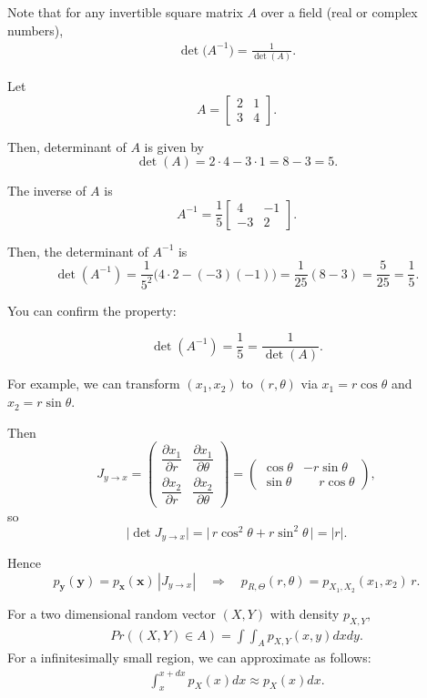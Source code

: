 Note that for any invertible square matrix $A$ over a field (\eg real or complex numbers),
\begin{align*}
	\det\bigl(A^{-1}\bigr)=\frac{1}{\det(A)}.
\end{align*}

Let
$$
A=\begin{bmatrix}
2 & 1\\[2pt]
3 & 4
\end{bmatrix}.
$$

Then, determinant of $A$ is given by
$$
\det(A)=2\cdot4-3\cdot1 = 8-3 = 5.
$$

The inverse of $A$ is 
$$
A^{-1}= \frac{1}{5}\begin{bmatrix}
4 & -1\\[2pt] -3 & 2
\end{bmatrix}.
$$

Then, the determinant of $A^{-1}$ is
$$
\det(A^{-1}) = \frac{1}{5^2}\bigl(4\cdot2-(-3)(-1)\bigr)
=\frac{1}{25}(8-3)=\frac{5}{25}=\frac{1}{5}.
$$

You can confirm the property:

$$
\det(A^{-1})=\frac{1}{5}=\frac{1}{\det(A)}.
$$


For example, we can transform $(x_1,x_2)$ to $(r,\theta)$ via $x_1=r\cos\theta$ and $x_2=r\sin\theta$.

Then
\[
J_{y\to x}=
\begin{pmatrix}
\dfrac{\partial x_1}{\partial r} & \dfrac{\partial x_1}{\partial\theta}\\[6pt]
\dfrac{\partial x_2}{\partial r} & \dfrac{\partial x_2}{\partial\theta}
\end{pmatrix}
=
\begin{pmatrix}
\cos\theta & -r\sin\theta\\
\sin\theta & \phantom{-}r\cos\theta
\end{pmatrix},
\tag{3}
\]
so
\[
\bigl|\det J_{y\to x}\bigr|
 = \bigl|\,r\cos^{2}\theta + r\sin^{2}\theta\,\bigr|
 = |r|.
\tag{4}
\]

Hence
\[
p_{\mathbf{y}}(\mathbf{y}) = p_{\mathbf{x}}(\mathbf{x})\,|J_{y\to x}|
\quad\Longrightarrow\quad
p_{R,\Theta}(r,\theta) = p_{X_1,X_2}(x_1,x_2)\,r.
\tag{5--6}
\]

For a two dimensional random vector $(X,Y)$ with density $p_{X,Y}$, 
\begin{align*}
	Pr((X,Y)\in A) = \int\int_A p_{X,Y}(x,y)dxdy.
\end{align*}
For a infinitesimally small region, we can approximate as follows:
\begin{align*}
	\int_x^{x+dx} p_{X}(x)dx \approx  p_{X}(x)dx.
\end{align*}

